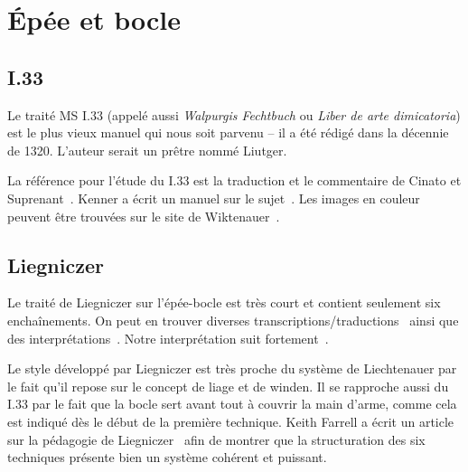 \chapter{Épée et bocle}





\section{I.33}



Le traité MS I.33 (appelé aussi \emph{Walpurgis Fechtbuch} ou \emph{Liber de arte dimicatoria}) est le plus vieux manuel qui nous soit parvenu – il a été rédigé dans la décennie de 1320.
L'auteur serait un prêtre nommé Liutger.

La référence pour l'étude du I.33 est la traduction et le commentaire de Cinato et Suprenant~\cite{cinato:I33:2009}.
Kenner a écrit un manuel sur le sujet~\cite{kenner:I33:2014}.
Les images en couleur peuvent être trouvées sur le site de Wiktenauer~\cite{wiktenauer:I33}.




\section{Liegniczer}


Le traité de Liegniczer sur l'épée-bocle est très court et contient seulement six enchaînements.
On peut en trouver diverses transcriptions/traductions~\cite{ardamhe:liegniczer, farrell:liegnieczer, lindholm:ringeck_others:2006} ainsi que des interprétations~\cite{farrell:pedagogy_liegnieczer:2014, youtube:sala_armi:liegniczer, youtube:memag:liegniczer, lindholm:ringeck_others:2006, Myers:LiegniczerBuckler, knight:epee_bocle}.
Notre interprétation suit fortement~\cite{youtube:sala_armi:liegniczer, youtube:memag:liegniczer, farrell:pedagogy_liegnieczer:2014}.

Le style développé par Liegniczer est très proche du système de Liechtenauer par le fait qu'il repose sur le concept de liage et de winden.
Il se rapproche aussi du I.33 par le fait que la bocle sert avant tout à couvrir la main d'arme, comme cela est indiqué dès le début de la première technique.
Keith Farrell a écrit un article sur la pédagogie de Liegniczer~\cite{farrell:pedagogy_liegnieczer:2014} afin de montrer que la structuration des six techniques présente bien un système cohérent et puissant.

